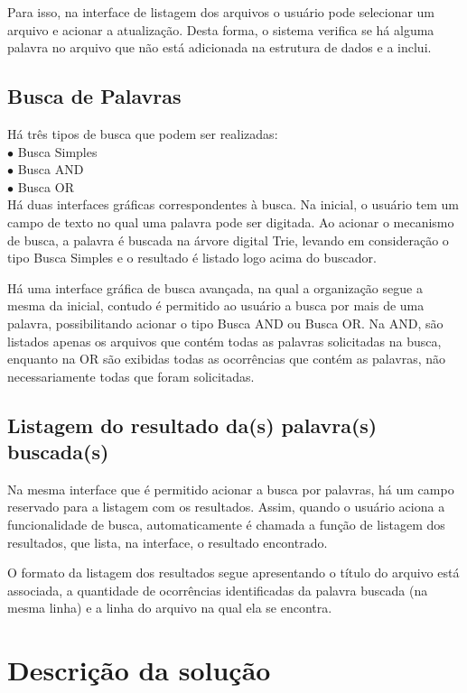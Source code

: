 \documentclass[12pt]{article}
\begin{document}
	Para isso, na interface de listagem dos arquivos o usuário pode selecionar um arquivo e acionar a atualização. Desta forma, o sistema verifica se há alguma palavra no arquivo que não está adicionada na estrutura de dados e a inclui.

\subsection{Busca de Palavras}
Há três tipos de busca que podem ser realizadas: \\
$\bullet$ Busca Simples\\
$\bullet$ Busca AND\\
$\bullet$ Busca OR\\

Há duas interfaces gráficas correspondentes à busca. Na inicial, o usuário tem um campo de texto no qual uma palavra pode ser digitada. Ao acionar o mecanismo de busca, a palavra é buscada na árvore digital Trie, levando em consideração o tipo Busca Simples e o resultado é listado logo acima do buscador.

Há uma interface gráfica de busca avançada, na qual a organização segue a mesma da inicial, contudo é permitido ao usuário a busca por mais de uma palavra, possibilitando acionar o tipo Busca AND ou Busca OR. Na AND, são listados apenas os arquivos que contém todas as palavras solicitadas na busca, enquanto na OR são exibidas todas as ocorrências que contém as palavras, não necessariamente todas que foram solicitadas.

\subsection{Listagem do resultado da(s) palavra(s) buscada(s)}
Na mesma interface que é permitido acionar a busca por palavras, há um campo reservado para a listagem com os resultados. Assim, quando o usuário aciona a funcionalidade de busca, automaticamente é chamada a função de listagem dos resultados, que lista, na interface, o resultado encontrado.

	O formato da listagem dos resultados segue apresentando o título do arquivo está associada, a quantidade de ocorrências identificadas da palavra buscada (na mesma linha) e a linha do arquivo na qual ela se encontra.

\section{Descrição da solução}
 
\end{document}
